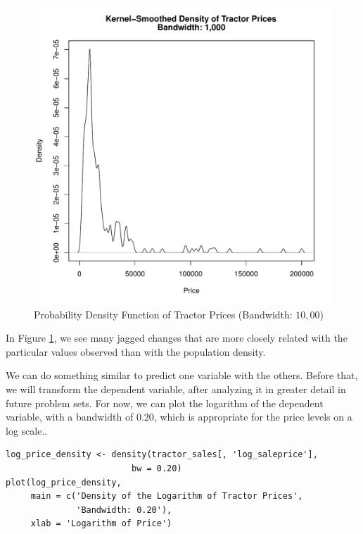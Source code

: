 \documentclass[11pt]{book}
\begin{document}
\begin{figure}[h!]
  \centering
  \includegraphics[scale = 0.5, keepaspectratio=true]{../Figures/density_saleprice_bw1000}
  \caption{Probability Density Function of Tractor Prices (Bandwidth: $10,00$)} \label{fig:density_saleprice_bw1000}
\end{figure}

In Figure \ref{fig:density_saleprice_bw1000},
we see many jagged changes that are more closely related
with the particular values observed
than with the population density.

\pagebreak
We can do something similar to predict one variable
with the others.
Before that, we will transform the dependent variable,
after analyzing it in greater detail in future problem sets.
For now, we can plot the logarithm of the dependent variable,
with a bandwidth of $0.20$, which is appropriate for the price levels on a log scale..


\begin{verbatim}
log_price_density <- density(tractor_sales[, 'log_saleprice'],
                         bw = 0.20)
plot(log_price_density,
     main = c('Density of the Logarithm of Tractor Prices',
              'Bandwidth: 0.20'),
     xlab = 'Logarithm of Price')
\end{verbatim}
\end{document}
